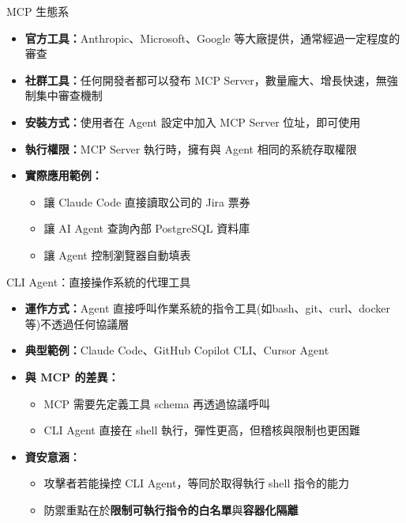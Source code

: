 \documentclass[aspectratio=1610]{Common/MyCourseBeamer}
\begin{document}
\begin{frame}{MCP 生態系}

	\begin{itemize}
		\item \textbf{官方工具：}Anthropic、Microsoft、Google 等大廠提供，通常經過一定程度的審查

		\item \textbf{社群工具：}任何開發者都可以發布 MCP Server，數量龐大、增長快速，\alert{無強制集中審查機制}

		\item \textbf{安裝方式：}使用者在 Agent 設定中加入 MCP Server 位址，即可使用

		\item \textbf{執行權限：}MCP Server 執行時，擁有與 Agent 相同的系統存取權限

		\item \textbf{實際應用範例：}
			\begin{itemize}
				\item 讓 Claude Code 直接讀取公司的 Jira 票券
				\item 讓 AI Agent 查詢內部 PostgreSQL 資料庫
				\item 讓 Agent 控制瀏覽器自動填表
			\end{itemize}
	\end{itemize}

\end{frame}

\begin{frame}{CLI Agent：直接操作系統的代理工具}

	\begin{itemize}
		\item \textbf{運作方式：}Agent 直接呼叫作業系統的指令工具(如bash、git、curl、docker 等)不透過任何協議層

		\item \textbf{典型範例：}Claude Code、GitHub Copilot CLI、Cursor Agent

		\item \textbf{與 MCP 的差異：}
			\begin{itemize}
				\item MCP 需要先定義工具 schema 再透過協議呼叫
				\item CLI Agent 直接在 shell 執行，彈性更高，但\alert{稽核與限制也更困難}
			\end{itemize}

		\item \textbf{資安意涵：}
			\begin{itemize}
				\item 攻擊者若能操控 CLI Agent，等同於取得執行 shell 指令的能力
				\item 防禦重點在於\textbf{限制可執行指令的白名單}與\textbf{容器化隔離}
			\end{itemize}
	\end{itemize}

\end{frame}
\end{document}
